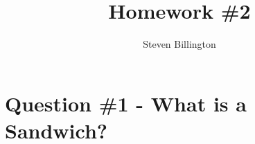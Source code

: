 \documentclass[
	letterpaper, %
]{jdf}
\author{Steven Billington}
\title{Homework \#2}
\begin{document}

\maketitle


\section{Question \#1 - What is a Sandwich?}
\end{document}
